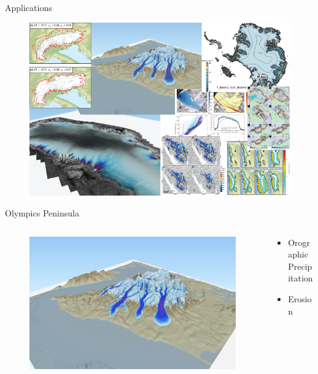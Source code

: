 \documentclass[hide notes,intlimits]{beamer}
\begin{document}
\begin{frame}{Applications}
  \begin{figure}
    \includegraphics[width=\textwidth]{pism-applications-composite-01}
  \end{figure}

\end{frame}


\begin{frame}{Olympics Peninsula}
    \begin{columns}[c]
      \begin{column}{.45\linewidth}
        \begin{figure}
          \includegraphics[width=\textwidth]{olympics-3d}
        \end{figure}
      \end{column}
      \begin{column}{.55\linewidth}
        \begin{itemize}
        \item Orographic Precipitation
        \item Erosion
        \end{itemize}
      \end{column}
    \end{columns}  
\end{frame}
\end{document}
